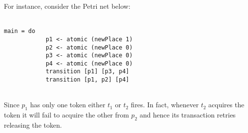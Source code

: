 For instance, consider the Petri net below:
\\\\
\noindent
\begin{BVerbatim}[tabsize=3, xleftmargin=1ex, gobble=2]
        main = do
            p1 <- atomic (newPlace 1)
            p2 <- atomic (newPlace 0)
            p3 <- atomic (newPlace 0)
            p4 <- atomic (newPlace 0)
            transition [p1] [p3, p4]
            transition [p1, p2] [p4]
\end{BVerbatim}
\hfill
\begin{minipage}[t]{.33\linewidth}
\end{minipage}
\\[1ex]
Since $p_1$ has only one token either $t_1$ or $t_2$ fires. In fact,
whenever $t_2$ acquires the token it will fail to acquire the other
from $p_2$ and hence its transaction retries releasing the token.
\newpage
